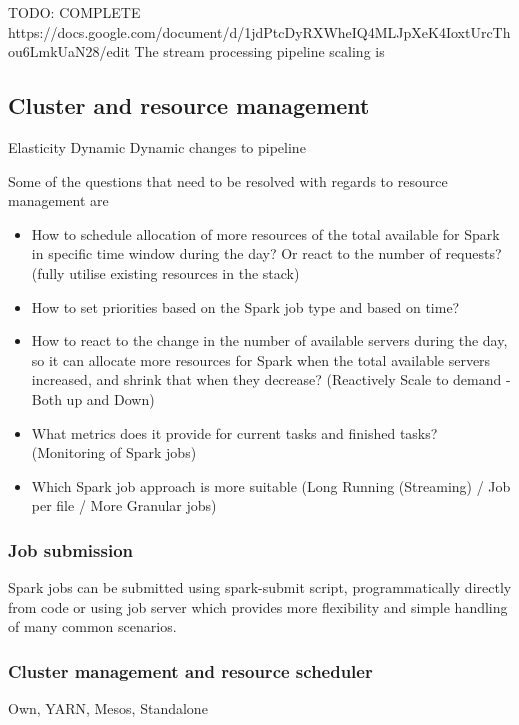 \documentclass[a4paper, 10 pt, conference]{IEEEtran}
\begin{document}
 
TODO: COMPLETE https://docs.google.com/document/d/1jdPtcDyRXWheIQ4MLJpXeK4IoxtUrcThou6LmkUaN28/edit
The stream processing pipeline scaling is 

\subsection{Cluster and resource management}
Elasticity
Dynamic
Dynamic changes to pipeline

Some of the questions that need to be resolved with regards to resource management are

\begin{itemize}
  \item How to schedule allocation of more resources of the total available for Spark in specific time window during the day? Or react to the number of requests? (fully utilise existing resources in the stack)
  
  \item How to set priorities based on the Spark job type and based on time?
  
  \item How to react to the change in the number of available servers during the day, so it can allocate more resources for Spark when the total available servers increased, and shrink that when they decrease? (Reactively Scale to demand - Both up and Down) 
  
  \item What metrics does it provide for current tasks and finished tasks? (Monitoring of Spark jobs)

  \item Which Spark job approach is more suitable  (Long Running (Streaming) / Job per file / More Granular jobs) 
    
\end{itemize}

\subsubsection{Job submission}
Spark jobs can be submitted using spark-submit script, programmatically directly from code or using job server which provides more flexibility and simple handling  of many common scenarios.

\subsubsection{Cluster management and resource scheduler}
Own, YARN, Mesos, Standalone
\end{document}
